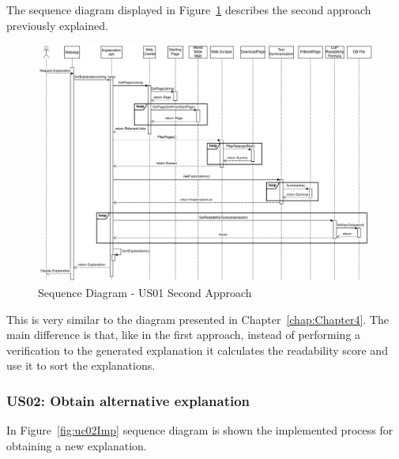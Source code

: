 The sequence diagram displayed in Figure~\ref{fig:uc01Imp2} describes the second approach previously explained.

\begin{figure}[H]
\centering
\includegraphics[width=\textwidth]{ch5/assets/US01_SD_Implement_Ap2.png}
\caption[Sequence Diagram US01 Second Approach]{Sequence Diagram - US01 Second Approach}
\label{fig:uc01Imp2}
\end{figure}

This is very similar to the diagram presented in Chapter~\ref{chap:Chapter4}.
The main difference is that, like in the first approach, instead of performing a verification to the generated explanation it calculates the readability score and use it to sort the explanations.

\subsubsection{US02: Obtain alternative explanation}

In Figure~\ref{fig:uc02Imp} sequence diagram is shown the implemented process for obtaining a new explanation.

